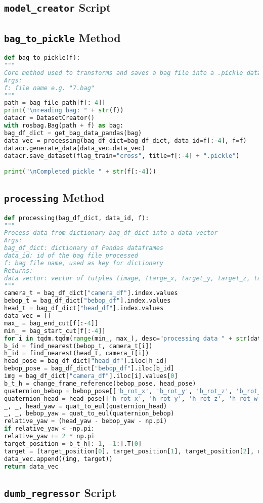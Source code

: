 \subsection*{\texttt{model\_creator} Script}
%
\subsection*{\texttt{bag\_to\_pickle} Method}
\begin{lstlisting}[caption={Extract that shows the method \text{bag\_to\_pickle}},label={lst:bagtopickle},language=Python]
def bag_to_pickle(f):
"""
Core method used to transforms and saves a bag file into a .pickle dataset file
Args:
f: file name e.g. "7.bag"
"""
path = bag_file_path[f[:-4]]
print("\nreading bag: " + str(f))
datacr = DatasetCreator()
with rosbag.Bag(path + f) as bag:
bag_df_dict = get_bag_data_pandas(bag)
data_vec = processing(bag_df_dict=bag_df_dict, data_id=f[:-4], f=f)
datacr.generate_data(data_vec=data_vec)
datacr.save_dataset(flag_train="cross", title=f[:-4] + ".pickle")

print("\nCompleted pickle " + str(f[:-4]))
\end{lstlisting}
\subsection*{\texttt{processing} Method}
\begin{lstlisting}[caption={\texttt{processing}} method,label={lst:processing},language=Python]
def processing(bag_df_dict, data_id, f):
"""
Process data from dictionary bag_df_dict into a data vector
Args:
bag_df_dict: dictionary of Pandas dataframes
data_id: id of the bag file processed
f: bag file name, used as key for dictionary
Returns:
data vector: vector of tutples (image, (targe_x, target_y, target_z, target_relative_yaw)
"""
camera_t = bag_df_dict["camera_df"].index.values
bebop_t = bag_df_dict["bebop_df"].index.values
head_t = bag_df_dict["head_df"].index.values
data_vec = []
max_ = bag_end_cut[f[:-4]]
min_ = bag_start_cut[f[:-4]]
for i in tqdm.tqdm(range(min_, max_), desc="processing data " + str(data_id)):
b_id = find_nearest(bebop_t, camera_t[i])
h_id = find_nearest(head_t, camera_t[i])
head_pose = bag_df_dict["head_df"].iloc[h_id]
bebop_pose = bag_df_dict["bebop_df"].iloc[b_id]
img = bag_df_dict["camera_df"].iloc[i].values[0]
b_t_h = change_frame_reference(bebop_pose, head_pose)
quaternion_bebop = bebop_pose[['b_rot_x', 'b_rot_y', 'b_rot_z', 'b_rot_w']].values
quaternion_head = head_pose[['h_rot_x', 'h_rot_y', 'h_rot_z', 'h_rot_w']].values
_, _, head_yaw = quat_to_eul(quaternion_head)
_, _, bebop_yaw = quat_to_eul(quaternion_bebop)
relative_yaw = (head_yaw - bebop_yaw - np.pi)
if relative_yaw < -np.pi:
relative_yaw += 2 * np.pi
target_position = b_t_h[:-1, -1:].T[0]
target = (target_position[0], target_position[1], target_position[2], relative_yaw)
data_vec.append((img, target))
return data_vec
\end{lstlisting}
\subsection*{\texttt{dumb\_regressor} Script}
%
